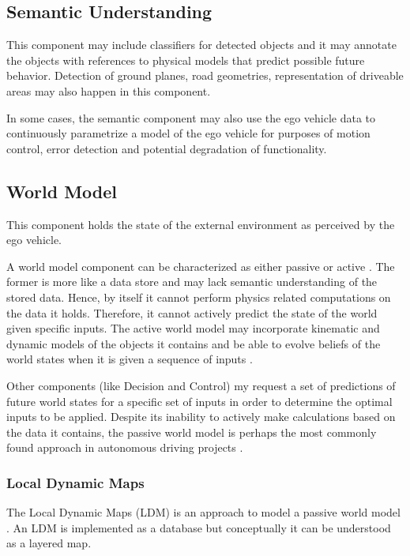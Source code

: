 \subsection{Semantic Understanding}
This component may include classifiers for detected objects and it may annotate the objects with references to physical models that predict possible future behavior. Detection of ground planes, road geometries, representation of driveable areas may also happen in this component.

In some cases, the semantic component may also use the ego vehicle data to continuously parametrize a model of the ego vehicle for purposes of motion control, error detection and potential degradation of functionality.

\subsection{World Model}
This component holds the state of the external environment as perceived by the ego vehicle.

A world model component can be characterized as either passive or active \cite{Bahere}. 
The former is more like a data store and may lack semantic understanding of the stored data. 
Hence, by itself it cannot perform physics related computations on the data it holds. 
Therefore, it cannot actively predict the state of the world given specific inputs. 
The active world model may incorporate kinematic and dynamic models of the objects it contains 
and be able to evolve beliefs of the world states when it is given a sequence of inputs \cite{Bahere}.

Other components (like Decision and Control) my request a set of predictions of future world states for a specific set of
inputs in order to determine the optimal inputs to be applied.
Despite its inability to actively make calculations based on the data it contains, the passive world model is perhaps the most commonly found approach in autonomous driving projects \cite{Bahere}. 




\subsubsection{Local Dynamic Maps}

The Local Dynamic Maps (LDM) is an approach to model a passive world model \cite{Bahere, ETSITR102}. 
An LDM is implemented as a database but conceptually it can be understood as a layered map. 

